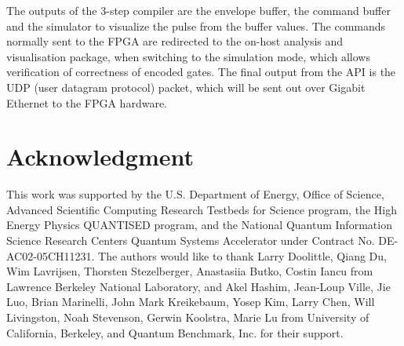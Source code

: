 \documentclass{ieeetran}
\begin{document}
The outputs of the 3-step compiler are the envelope buffer, the command buffer and the simulator to visualize the pulse from the buffer values. 
The commands normally sent to the FPGA are redirected to the on-host analysis and visualisation package, when switching to the simulation mode, which allows verification of correctness of encoded gates.
The final output from the API is the UDP (user datagram protocol) packet, which will be sent out over Gigabit Ethernet to the FPGA hardware.

\section*{Acknowledgment}
This work was supported by the U.S. Department of Energy, Office of Science, Advanced Scientific Computing Research Testbeds for Science program, the High Energy Physics QUANTISED program, and the National Quantum Information Science Research Centers Quantum Systems Accelerator under Contract No. DE-AC02-05CH11231.
The authors would like to thank Larry Doolittle, Qiang Du, Wim Lavrijsen, Thorsten Stezelberger, Anastasiia Butko, Costin Iancu from Lawrence Berkeley National Laboratory, and Akel Hashim, Jean-Loup Ville, Jie Luo, Brian Marinelli, John Mark Kreikebaum, Yosep Kim, Larry Chen, Will Livingston, Noah Stevenson, Gerwin Koolstra, Marie Lu from University of California, Berkeley, and Quantum Benchmark, Inc. for their support.
\end{document}
